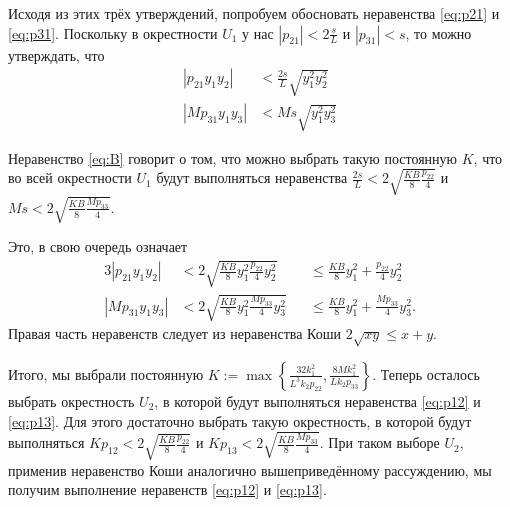 \documentclass{article}
\begin{document}
Исходя из этих трёх утверждений, попробуем обосновать неравенства \eqref{eq:p21} и \eqref{eq:p31}.
Поскольку в окрестности $U_1$ у нас  $|p_{21}|<2\frac{s}{L}$ и $|p_{31}|<s$, то можно утверждать, что
\begin{align*}
|p_{21}y_1 y_2| & < \frac{2s}{L} \sqrt{y_1^2 y_2^2}\\
|Mp_{31}y_1 y_3| & < Ms \sqrt{y_1^2 y_3^2}
\end{align*}


Неравенство \eqref{eq:B} говорит о том, что можно выбрать такую постоянную $K$, что во всей окрестности $U_1$ будут выполняться неравенства
$\frac{2s}{L} < 2 \sqrt{\frac{KB}{8}\frac{p_{22}}{4}}$ и $Ms < 2 \sqrt{\frac{KB}{8}\frac{Mp_{33}}{4}}$.

Это, в свою очередь означает
\begin{alignat*}{3}
|p_{21}y_1 y_2| & < 2 \sqrt{\frac{KB}{8} y_1^2 \frac{p_{22}}{4}y_2^2} && \leq \frac{KB}{8}y_1^2 + \frac{p_{22}}{4}y_2^2 \\
|Mp_{31}y_1 y_3| & < 2 \sqrt{\frac{KB}{8} y_1^2 \frac{M p_{33}}{4}y_3^2} && \leq \frac{KB}{8}y_1^2 + \frac{Mp_{33}}{4} y_3^2.
\end{alignat*}
Правая часть неравенств следует из неравенства Коши $2\sqrt{xy} \leq x+y$.

Итого, мы выбрали постоянную $K:=\max\left\{\frac{32k_1^2}{L^3k_2p_{22}}, \frac{8Mk_1^2}{Lk_2p_{33}}\right\}$. 
Теперь осталось выбрать окрестность $U_2$, в которой будут выполняться неравенства \eqref{eq:p12} и \eqref{eq:p13}.
Для этого достаточно выбрать такую окрестность, в которой будут выполняться
$Kp_{12} < 2 \sqrt{\frac{KB}{8}\frac{p_{22}}{4}}$ и $Kp_{13} < 2 \sqrt{\frac{KB}{8}\frac{Mp_{33}}{4}}$.
При таком выборе $U_2$, применив неравенство Коши аналогично вышеприведённому рассуждению, мы получим выполнение неравенств \eqref{eq:p12} и \eqref{eq:p13}.
\end{document}
